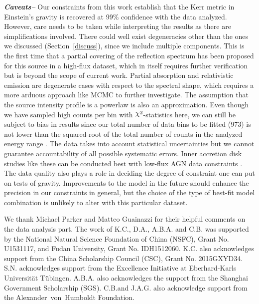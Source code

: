 \documentclass[aps,prd,twocolumn,superscriptaddress,nofootinbib,amsmath,amssymb]{revtex4-1}
\DeclareRobustCommand{\rchi}{{\mathpalette\irchi\relax}}
\newcommand{\irchi}[2]{\raisebox{\depth}{$#1\chi$}} %
\begin{document}
\textbf{\textit{Caveats--}} Our constraints from this work establish that the Kerr metric in Einstein's gravity is recovered at 99\% confidence with the data analyzed. However, care needs to be taken while interpreting the results as there are simplifications involved. There could well exist degeneracies other than the ones we discussed (Section~\ref{discuss}), since we include multiple components. This is the first time that a partial covering of the reflection spectrum has been proposed for this source in a high-flux dataset, which in itself requires further verification but is beyond the scope of current work. Partial absorption and relativistic emission are degenerate cases with respect to the spectral shape, which requires a more arduous approach like MCMC to further investigate. The assumption that the source intensity profile is a powerlaw is also an approximation. Even though we have sampled high counts per bin with $\rchi^2$-statistics here, we can still be subject to bias in results since our total number of data bins to be fitted (973) is not lower than the squared-root of the total number of counts in the analyzed energy range \citep{cstat2009}. The data takes into account statistical uncertainties but we cannot guarantee accountability of all possible systematic errors. Inner accretion disk studies like these can be conducted best with low-flux AGN data constraints \citep[e.g.,][]{BR2006}. The data quality also plays a role in deciding the degree of constraint one can put on tests of gravity. Improvements to the model in the future should enhance the precision in our constraints in general, but the choice of the type of best-fit model combination is unlikely to alter with this particular dataset.\\


\begin{acknowledgments}
We thank Michael Parker and Matteo Guainazzi for their helpful comments on the data analysis part. The work of K.C., D.A., A.B.A. and C.B. was supported by the National Natural Science Foundation of China (NSFC), Grant No. U1531117, and Fudan University, Grant No. IDH1512060. K.C. also acknowledges support from the China Scholarship Council (CSC), Grant No. 2015GXYD34. S.N. acknowledges support from the Excellence Initiative at Eberhard-Karls Universit{\"a}t T{\"u}bingen. A.B.A. also acknowledges the support from the Shanghai Government Scholarship (SGS). C.B.and J.A.G. also acknowledge support from the Alexander~von~Humboldt Foundation.
\end{acknowledgments}



\end{document}
